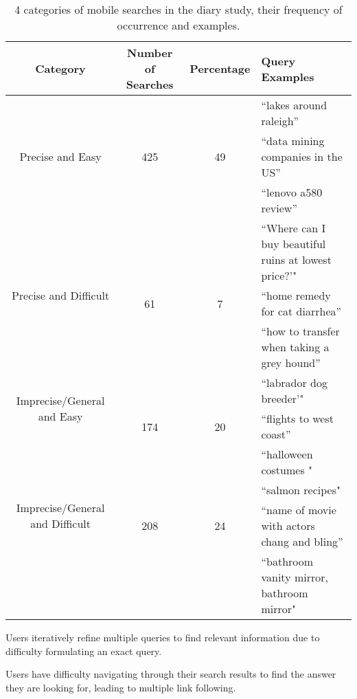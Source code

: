 \begin{table*}[ht]
\begin{center}
    \begin{tabular}{ | c | c | c | l |}
    \hline
    Category &  Number of Searches & Percentage & Query Examples \\ \hline
   \multirow{3}{*}{Precise and Easy} & & &  ``lakes around raleigh'' \\
    					   & 425 & 49 & ``data mining companies in the US''\\ 				
					   & &  &  ``lenovo a580 review''  \\ \hline 
					   
   \multirow{3}{*}{Precise and Difficult} & & & ``Where can I buy beautiful ruins at lowest price?'"\\
    					   & 61 & 7 & ``home remedy for cat diarrhea''\\ 				
					   & &  & ``how to transfer when taking a grey hound''  \\ \hline 

   \multirow{2}{*}{ Imprecise/General and Easy} & & & ``labrador dog breeder'"\\
    					   & 174 & 20 & ``flights to west coast''\\
					   & & & ``halloween costumes "\\ \hline 

   \multirow{2}{*}{ Imprecise/General and Difficult} & & & ``salmon recipes"\\
    					   & 208 & 24 & ``name of movie with actors chang and bling''\\
					   & & & ``bathroom vanity mirror, bathroom mirror"\\ \hline 

   
 \end{tabular}
\end{center}
\label{searchcategories}
\caption{4 categories of mobile searches in the diary study, their frequency of occurrence and examples.}
\end{table*}

\begin{tight_enumerate}
\item Users iteratively refine multiple queries to find relevant information due to difficulty formulating an exact query. 
\item Users have difficulty navigating through their search results to find the answer they are looking for, leading to multiple link following.
\end{tight_enumerate}

